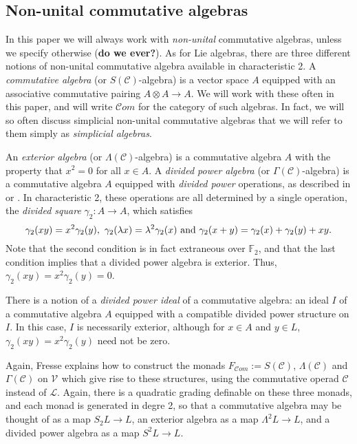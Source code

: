 \documentclass[11pt]{amsart}
\theoremstyle{plain}
\theoremstyle{definition}
\renewcommand{\to}{\longrightarrow}
\newcommand{\scrL}{\mathscr{L}}
\newcommand{\scrC}{\mathscr{C}}
\newcommand{\calV}{\mathcal{V}}
\theoremstyle{plain}
\newcommand{\LieOperad}{{\scrL}}
\newcommand{\CommOperad}{{\scrC}}
\newcommand{\vect}[2]{\calV^{#1}_{#2}}
\newcommand{\F}{\mathbb{F}}
\newcommand{\algs}{\scrC\!\textit{om}}
\begin{document}
\begin{Conventions and notation}
\subsection{Non-unital commutative algebras}
In this paper we will always work with \emph{non-unital} commutative algebras, unless we specify otherwise (\textbf{do we ever?}). As for Lie algebras, there are three different notions of non-unital commutative algebra available in characteristic 2. A \emph{commutative algebra} (or $S(\CommOperad)$-algebra) is a vector space $A$ equipped with an associative commutative pairing $A\otimes A\to A$.  We will work with these often in this paper, and will write $\algs$ for the category of such algebras. In fact, we will so often discuss simplicial non-unital commutative algebras that we will refer to them simply as \emph{simplicial algebras}.

An \emph{exterior algebra} (or $\Lambda(\CommOperad)$-algebra) is a commutative algebra $A$ with the property that $x^2=0$ for all $x\in A$. A \emph{divided power algebra} (or $\Gamma(\CommOperad)$-algebra) is a commutative algebra $A$ equipped with \emph{divided power} operations, as described in \cite[1.2.2]{FresseSimplicialAlgs.pdf} or \cite[\S2]{MR1089001}. In characteristic 2, these operations are all determined by a single operation, the \emph{divided square} $\gamma_2:A\to A$, which satisfies
\[\gamma_2(xy)=x^2\gamma_2(y),\ \gamma_2(\lambda x)=\lambda^2\gamma_2(x)\textup{ and }\gamma_2(x+y)=\gamma_2(x)+\gamma_2(y)+xy.\]
Note that the second condition is in fact extraneous over $\F_2$, and that the last condition implies that a divided power algebra is exterior. Thus, $\gamma_2(xy)=x^2\gamma_2(y)=0$.

There is a notion of a \emph{divided power ideal} of a commutative algebra: an ideal $I$ of a commutative algebra $A$ equipped with a compatible divided power structure on $I$. In this case, $I$ is necessarily exterior, although for $x\in A$ and $y\in L$, $\gamma_2(xy)=x^2\gamma_2(y)$ need not be zero.

Again, Fresse \cite{FresseSimplicialAlgs.pdf} explains how to construct the monads $F_{\algs}:=S(\CommOperad)$, $\Lambda(\CommOperad)$ and $\Gamma(\CommOperad)$ on $\vect{}{}$ which give rise to these structures, using the commutative operad $\CommOperad$ instead of $\LieOperad$. Again, there is a quadratic grading definable on these three monads, and each monad is generated in degre 2, so that a commutative algebra may be thought of as a  map $S_2L\to L$, an exterior algebra as a map $\Lambda^2L\to L$, and a divided power algebra as a map $S^2L\to L$.











\end{Conventions and notation}
\end{document}
